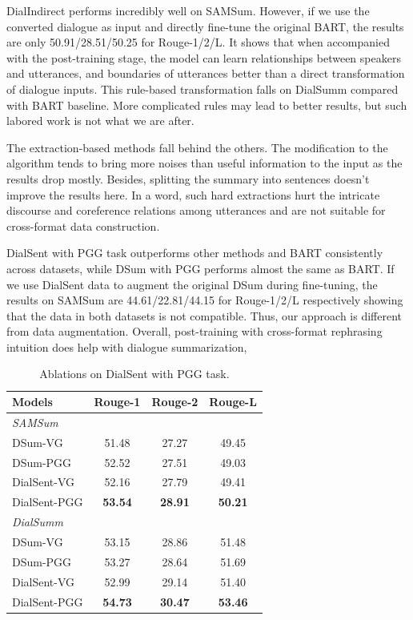 DialIndirect performs incredibly well on SAMSum. However, if we use the converted dialogue as input and directly fine-tune the original BART, the results are only 50.91/28.51/50.25 for Rouge-1/2/L.
It shows that when accompanied with the post-training stage, the model can learn relationships between speakers and utterances, and boundaries of utterances better than a direct transformation of dialogue inputs. 
This rule-based transformation falls on DialSumm compared with BART baseline. More complicated rules may lead to better results, but such labored work is not what we are after. 

The extraction-based methods fall behind the others. The modification to the algorithm tends to bring more noises than useful information to the input as the results drop mostly. 
Besides, splitting the summary into sentences doesn't improve the results here.
In a word, such hard extractions hurt the intricate discourse and coreference relations among utterances and are not suitable for cross-format data construction.

DialSent with PGG task outperforms other methods and BART consistently across datasets, while DSum with PGG performs almost the same as BART.
If we use DialSent data to augment the original DSum during fine-tuning, the results on SAMSum are 44.61/22.81/44.15 for Rouge-1/2/L respectively showing that the data in both datasets is not compatible. Thus, our approach is different from data augmentation.
Overall, post-training with cross-format rephrasing intuition does help with dialogue summarization,

\begin{table}
	\small
	\centering
	\begin{tabular}{lccc}
		\toprule[1pt]
		\textbf{Models} & \textbf{Rouge-1} & \textbf{Rouge-2} & \textbf{Rouge-L} \\
		\midrule[1pt]
		\multicolumn{4}{l}{\textit{SAMSum}} \\
		{DSum-VG} &51.48 &27.27 &49.45 \\
		{DSum-PGG} &52.52 &27.51 & 49.03\\
		{DialSent-VG} &52.16 &27.79 & 49.41\\
		{DialSent-PGG} &\textbf{53.54} &\textbf{28.91} &\textbf{50.21}\\
		\midrule[1pt]
		\multicolumn{4}{l}{\textit{DialSumm}} \\
		{DSum-VG} &53.15 &28.86 & 51.48\\
		{DSum-PGG} &53.27 &28.64 &51.69 \\
		{DialSent-VG} &52.99 & 29.14& 51.40\\
		{DialSent-PGG} &\textbf{54.73} & \textbf{30.47}&\textbf{53.46} \\
		\bottomrule[1pt]
	\end{tabular}
	\caption{Ablations on DialSent with PGG task.}
	\label{tab:pggablation}
\end{table}

